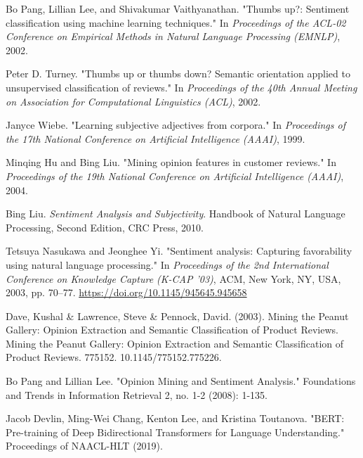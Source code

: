 \documentclass[12pt]{article}
\begin{document}
\begin{thebibliography}{}

Bo Pang, Lillian Lee, and Shivakumar Vaithyanathan. "Thumbs up?: Sentiment classification using machine learning techniques." In \textit{Proceedings of the ACL-02 Conference on Empirical Methods in Natural Language Processing (EMNLP)}, 2002.

Peter D. Turney. "Thumbs up or thumbs down? Semantic orientation applied to unsupervised classification of reviews." In \textit{Proceedings of the 40th Annual Meeting on Association for Computational Linguistics (ACL)}, 2002.

Janyce Wiebe. "Learning subjective adjectives from corpora." In \textit{Proceedings of the 17th National Conference on Artificial Intelligence (AAAI)}, 1999.

Minqing Hu and Bing Liu. "Mining opinion features in customer reviews." In \textit{Proceedings of the 19th National Conference on Artificial Intelligence (AAAI)}, 2004.

Bing Liu. \textit{Sentiment Analysis and Subjectivity}. Handbook of Natural Language Processing, Second Edition, CRC Press, 2010.

Tetsuya Nasukawa and Jeonghee Yi. "Sentiment analysis: Capturing favorability using natural language processing." In \textit{Proceedings of the 2nd International Conference on Knowledge Capture (K-CAP '03)}, ACM, New York, NY, USA, 2003, pp. 70–77. \url{https://doi.org/10.1145/945645.945658}

Dave, Kushal \& Lawrence, Steve \& Pennock, David. (2003). Mining the Peanut Gallery: Opinion Extraction and Semantic Classification of Product Reviews. Mining the Peanut Gallery: Opinion Extraction and Semantic Classification of Product Reviews. 775152. 10.1145/775152.775226. 

Bo Pang and Lillian Lee. "Opinion Mining and Sentiment Analysis." Foundations and Trends in Information Retrieval 2, no. 1-2 (2008): 1-135.

Jacob Devlin, Ming-Wei Chang, Kenton Lee, and Kristina Toutanova. "BERT: Pre-training of Deep Bidirectional Transformers for Language Understanding." Proceedings of NAACL-HLT (2019).


\end{thebibliography}
\end{document}
